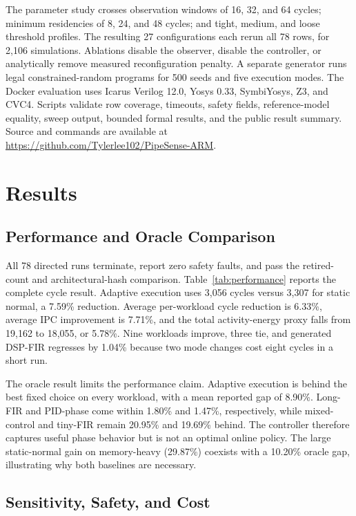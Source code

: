 \documentclass[conference]{IEEEtran}
\begin{document}
The parameter study crosses observation windows of 16, 32, and 64 cycles;
minimum residencies of 8, 24, and 48 cycles; and tight, medium, and loose
threshold profiles. The resulting 27 configurations each rerun all 78 rows,
for 2,106 simulations. Ablations disable the observer, disable the controller,
or analytically remove measured reconfiguration penalty. A separate generator
runs legal constrained-random programs for 500 seeds and five execution modes.
The Docker evaluation uses Icarus Verilog 12.0, Yosys 0.33, SymbiYosys, Z3,
and CVC4. Scripts validate row coverage, timeouts, safety fields,
reference-model equality, sweep output, bounded formal results, and the public
result summary. Source and commands are available at
\url{https://github.com/Tylerlee102/PipeSense-ARM}.

\section{Results}

\subsection{Performance and Oracle Comparison}

All 78 directed runs terminate, report zero safety faults, and pass the
retired-count and architectural-hash comparison. Table~\ref{tab:performance}
reports the complete cycle result. Adaptive execution uses 3,056 cycles versus
3,307 for static normal, a 7.59\% reduction. Average per-workload cycle
reduction is 6.33\%, average IPC improvement is 7.71\%, and the total
activity-energy proxy falls from 19,162 to 18,055, or 5.78\%. Nine workloads
improve, three tie, and generated DSP-FIR regresses by 1.04\% because two mode
changes cost eight cycles in a short run.



The oracle result limits the performance claim. Adaptive execution is behind
the best fixed choice on every workload, with a mean reported gap of 8.90\%.
Long-FIR and PID-phase come within 1.80\% and 1.47\%, respectively, while
mixed-control and tiny-FIR remain 20.95\% and 19.69\% behind. The controller
therefore captures useful phase behavior but is not an optimal online policy.
The large static-normal gain on memory-heavy (29.87\%) coexists with a 10.20\%
oracle gap, illustrating why both baselines are necessary.

\subsection{Sensitivity, Safety, and Cost}
\end{document}
